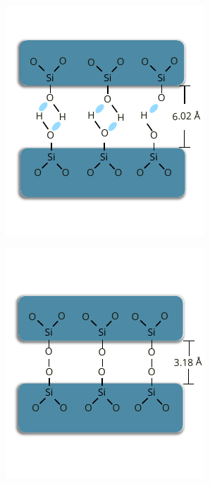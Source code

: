 \documentclass[final]{jyflluk}
\begin{document}
\begin{figure}[h]
\begin{subfigure}[ht]{0.3\textwidth}
        \includegraphics[width=\linewidth]{images/TDAB2.pdf} 
        \caption{} \label{fig:flossdfsdfdfsdfw1}
    \end{subfigure}
    \hfill
    \begin{subfigure}[ht]{0.3\textwidth}
        \centering
        \includegraphics[width=\linewidth]{images/TDAB1.pdf} 

\end{subfigure}
\end{figure}
\end{document}
